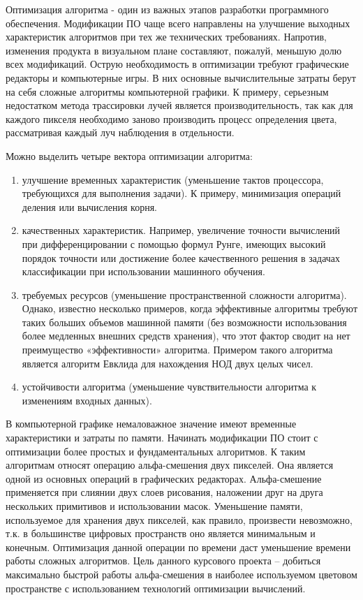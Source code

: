 \Introduction

 Оптимизация алгоритма - один из важных этапов разработки программного обеспечения. Модификации ПО чаще всего направлены на улучшение выходных характеристик алгоритмов при тех же технических требованиях. Напротив, изменения  продукта в визуальном плане составляют, пожалуй, меньшую долю всех модификаций. Острую необходимость в оптимизации  требуют графические редакторы и компьютерные игры. В них основные вычислительные затраты берут на себя сложные алгоритмы компьютерной графики. К примеру, серьезным недостатком метода трассировки лучей является производительность, так как для каждого пикселя необходимо заново производить процесс определения цвета, рассматривая каждый луч наблюдения в отдельности.
 
Можно выделить четыре вектора оптимизации алгоритма: 
\begin{enumerate}
\item улучшение временных характеристик (уменьшение тактов процессора, требующихся для выполнения задачи). К примеру, минимизация операций деления или вычисления корня. 
\item качественных характеристик. Например, увеличение точности вычислений при дифференцировании с помощью формул Рунге, имеющих высокий порядок точности или достижение более качественного решения в задачах классификации  при использовании машинного обучения.
\item требуемых ресурсов (уменьшение пространственной сложности алгоритма). Однако, известно несколько примеров, когда эффективные алгоритмы требуют таких больших объемов машинной памяти (без возможности использования более медленных внешних средств хранения), что этот фактор сводит на нет преимущество «эффективности» алгоритма. Примером такого алгоритма является алгоритм Евклида для нахождения НОД двух целых чисел.
\item устойчивости алгоритма (уменьшение чувствительности алгоритма к изменениям входных данных).
\end{enumerate}

В компьютерной графике немаловажное значение имеют временные характеристики и затраты по памяти. Начинать модификации ПО стоит с оптимизации более простых и фундаментальных алгоритмов. К таким алгоритмам относят операцию альфа-смешения двух пикселей. Она является одной из основных операций в графических редакторах. Альфа-смешение применяется при слиянии двух слоев рисования, наложении друг на друга нескольких  примитивов и использовании масок. Уменьшение памяти, используемое для хранения двух пикселей, как правило, произвести невозможно, т.к. в большинстве цифровых пространств оно является минимальным и конечным. Оптимизация данной операции по времени даст уменьшение времени работы сложных алгоритмов.  Цель данного курсового проекта -- добиться максимально быстрой работы альфа-смешения в наиболее используемом
цветовом пространстве с использованием технологий оптимизации вычислений.
 
  
 
 
 
